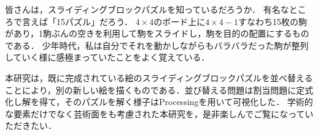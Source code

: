 
皆さんは，スライディングブロックパズルを知っているだろうか．
有名なところで言えば「15パズル」だろう．
\(4 \times 4\)のボード上に\(4 \times 4-1\)すなわち15枚の駒があり，1駒ぶんの空きを利用して駒をスライドし，駒を目的の配置にするものである．
少年時代，私は自分でそれを動かしながらもバラバラだった駒が整列していく様に感極まっていたことをよく覚えている．

本研究は，既に完成されている絵のスライディングブロックパズルを並べ替えることにより，別の新しい絵を描くものである．並び替える問題は割当問題に定式化し解を得て，そのパズルを解く様子はProcessingを用いて可視化した．
学術的な要素だけでなく芸術面をも考慮された本研究を，是非楽しんでご覧になっていただきたい．